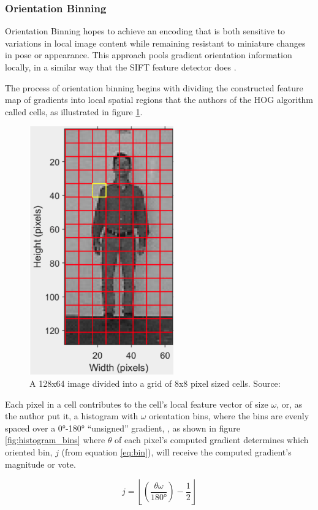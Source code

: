 \subsubsection{Orientation Binning}

Orientation Binning hopes to achieve an encoding that is both sensitive to variations in local image content while remaining resistant to miniature changes in pose or appearance. This approach pools gradient orientation information locally, in a similar way that the SIFT feature detector does \cite{lowe_2004_distinctive}.

The process of orientation binning begins with dividing the constructed feature map of gradients into local spatial regions that the authors of the HOG algorithm called cells, as illustrated in figure \ref{fig:cells}.

\begin{figure}
    \centering
    \includegraphics[width=0.3\linewidth]{images/cells.png}
    \caption{A 128x64 image divided into a grid of 8x8 pixel sized cells. Source: \cite{shidlovskiy_2020_reducing}}
    \label{fig:cells}
\end{figure}

Each pixel in a cell contributes to the cell’s local feature vector of size $\omega$, or, as the author put it, a histogram with $\omega$ orientation bins, where the bins are evenly spaced over a 0°-180° “unsigned” gradient, , as shown in figure \ref{fig:histogram_bins} where $\theta$ of each pixel's computed gradient determines which oriented bin, $j$ (from equation \ref{eq:bin}), will receive the computed gradient’s magnitude or vote. 

\begin{equation}
    \label{eq:bin}
    j = \left\lfloor  \left( \frac{\theta \omega}{180°} \right) - \frac{1}{2}  \right\rfloor 
\end{equation}

